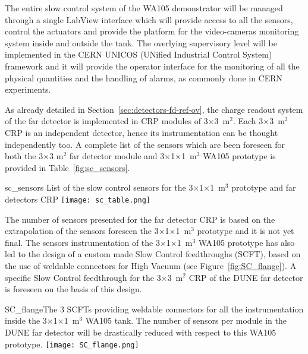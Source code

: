 The entire slow control system of the WA105 demonstrator will be
managed through a single LabView interface which will provide access
to all the sensors, control the actuators and provide the platform for
the video-cameras monitoring system inside and outside the tank. The
overlying supervisory level will be implemented in the CERN UNICOS
(UNified Industrial Control System) framework\cite{unicos} and it
will provide the operator interface for the monitoring of all the
physical quantities and the handling of alarms, as commonly done in
CERN experiments.

As already detailed in Section~\ref{sec:detectors-fd-ref-ov}, the
charge readout system of the far detector is implemented in CRP
modules of 3$\times$3~m$^2$. Each 3$\times$3~m$^2$ CRP is an
independent detector, hence its instrumentation can be thought
independently too. A complete list of the sensors which are been
foreseen for both the 3$\times$3 m$^2$ far detector module and
3$\times$1$\times$1~m$^3$ WA105 prototype is provided in
Table~\ref{fig:sc_sensors}. 
\begin{cdrfigure}{sc_sensors}
{List of the slow control sensors for the 3$\times$1$\times$1~m$^3$ prototype and far detectors CRP}
 \texttt{[image: sc\_table.png]} %
 \end{cdrfigure}
The number of sensors presented for the
far detector CRP is based on the extrapolation of the sensors foreseen
the 3$\times$1$\times$1~m$^3$ prototype and it is not yet final.
The sensors instrumentation of the 3$\times$1$\times$1~m$^3$ WA105
prototype has also led to the design of a custom made Slow Control
feedthroughs (SCFT), based on the use of weldable connectors for High
Vacuum (see Figure~\ref{fig:SC_flange}). A specific Slow Control
feedthrough for the 3$\times$3~m$^2$ CRP of the DUNE far detector is
foreseen on the basis of this design.
\begin{cdrfigure}{SC_flange}{The 3 SCFTs providing 
weldable connectors for all the instrumentation inside the 3$\times$1$\times$1~m$^3$  WA105 tank. 
The number of sensors per module in the DUNE far detector will be drastically 
reduced with respect to this WA105 prototype.}
  \texttt{[image: SC\_flange.png]}
 \end{cdrfigure}
